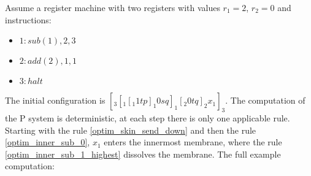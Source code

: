 \documentclass[submission,copyright,creativecommons]{../lib/lncs/llncs}
\begin{document}
\begin{example}
  Assume a register machine with two registers with values $r_1 = 2$, $r_2 = 0$ and instructions:
  \begin{itemize}
    \item $1: sub(1),2,3$
    \item $2: add(2),1,1$
    \item $3: halt$
  \end{itemize}

  The initial configuration is $[_3 [_1 [_1 1 t p ]_1 0 s q ]_1 [_2 0 t q ]_2 x_1 ]_3$. The computation of the P system is deterministic, at each step there is only one applicable rule. Starting with the rule \ref{optim_skin_send_down} and then the rule \ref{optim_inner_sub_0}, $x_1$ enters the innermost membrane, where the 
  rule \ref{optim_inner_sub_1_highest} dissolves the membrane. The full example computation:


\end{example}
\end{document}
